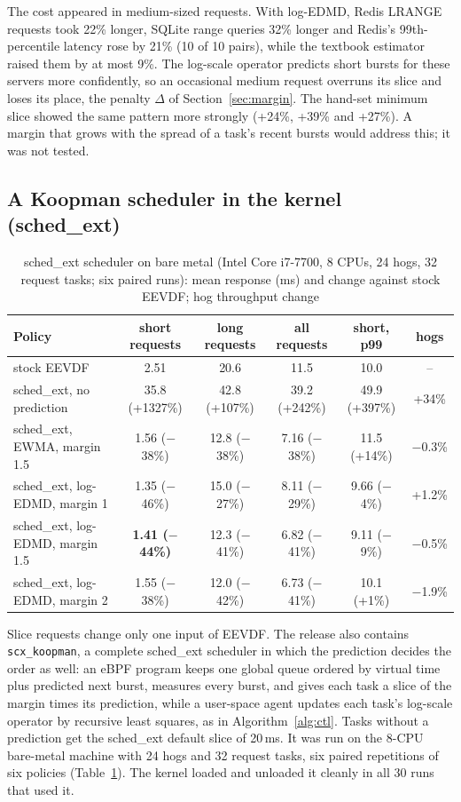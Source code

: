 \documentclass[conference,onecolumn,11pt]{IEEEtran}
\begin{document}
The cost appeared in medium-sized requests. With log-EDMD, Redis LRANGE requests took 22\% longer, SQLite range queries 32\% longer and Redis's 99th-percentile latency rose by 21\% (10 of 10 pairs), while the textbook estimator raised them by at most 9\%. The log-scale operator predicts short bursts for these servers more confidently, so an occasional medium request overruns its slice and loses its place, the penalty $\Delta$ of Section~\ref{sec:margin}. The hand-set minimum slice showed the same pattern more strongly (+24\%, +39\% and +27\%). A margin that grows with the spread of a task's recent bursts would address this; it was not tested.

\subsection{A Koopman scheduler in the kernel (sched\_ext)}\label{sec:scx}
\begin{table}[t]
\centering
\caption{sched\_ext scheduler on bare metal (Intel Core i7-7700, 8 CPUs, 24 hogs, 32 request tasks; six paired runs): mean response (ms) and change against stock EEVDF; hog throughput change}\label{tab:scx}
\begin{tabular}{@{}lccccc@{}}
\toprule
Policy & short requests & long requests & all requests & short, p99 & hogs \\
\midrule
stock EEVDF & 2.51 & 20.6 & 11.5 & 10.0 & -- \\
sched\_ext, no prediction & 35.8 (+1327\%) & 42.8 (+107\%) & 39.2 (+242\%) & 49.9 (+397\%) & +34\% \\
sched\_ext, EWMA, margin 1.5 & 1.56 ($-$38\%) & 12.8 ($-$38\%) & 7.16 ($-$38\%) & 11.5 (+14\%) & $-$0.3\% \\
sched\_ext, log-EDMD, margin 1 & 1.35 ($-$46\%) & 15.0 ($-$27\%) & 8.11 ($-$29\%) & 9.66 ($-$4\%) & +1.2\% \\
sched\_ext, log-EDMD, margin 1.5 & \textbf{1.41 ($-$44\%)} & 12.3 ($-$41\%) & 6.82 ($-$41\%) & 9.11 ($-$9\%) & $-$0.5\% \\
sched\_ext, log-EDMD, margin 2 & 1.55 ($-$38\%) & 12.0 ($-$42\%) & 6.73 ($-$41\%) & 10.1 (+1\%) & $-$1.9\% \\
\bottomrule
\end{tabular}
\end{table}

Slice requests change only one input of EEVDF. The release also contains \texttt{scx\_koopman}, a complete sched\_ext scheduler in which the prediction decides the order as well: an eBPF program keeps one global queue ordered by virtual time plus predicted next burst, measures every burst, and gives each task a slice of the margin times its prediction, while a user-space agent updates each task's log-scale operator by recursive least squares, as in Algorithm~\ref{alg:ctl}. Tasks without a prediction get the sched\_ext default slice of 20\,ms. It was run on the 8-CPU bare-metal machine with 24 hogs and 32 request tasks, six paired repetitions of six policies (Table~\ref{tab:scx}). The kernel loaded and unloaded it cleanly in all 30 runs that used it.
\end{document}
